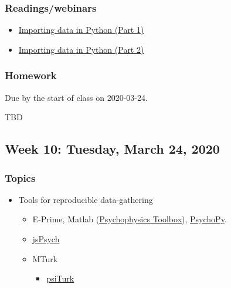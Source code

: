 \documentclass[
]{article}
\providecommand{\tightlist}{%
  \setlength{\itemsep}{0pt}\setlength{\parskip}{0pt}}
\begin{document}
\hypertarget{readingswebinars-6}{%
\subsubsection{Readings/webinars}\label{readingswebinars-6}}

\begin{itemize}
\tightlist
\item
  \href{https://www.datacamp.com/courses/importing-data-in-python-part-1}{Importing
  data in Python (Part 1)}
\item
  \href{https://www.datacamp.com/courses/importing-data-in-python-part-2}{Importing
  data in Python (Part 2)}
\end{itemize}

\hypertarget{homework-8}{%
\subsubsection{Homework}\label{homework-8}}

Due by the start of class on 2020-03-24.

TBD

\hypertarget{week-10-tuesday-march-24-2020}{%
\subsection{Week 10: Tuesday, March 24,
2020}\label{week-10-tuesday-march-24-2020}}

\hypertarget{topics-9}{%
\subsubsection{Topics}\label{topics-9}}

\begin{itemize}
\tightlist
\item
  Tools for reproducible data-gathering

  \begin{itemize}
  \tightlist
  \item
    E-Prime, Matlab (\href{http://psychtoolbox.org/}{Psychophysics
    Toolbox}), \href{http://www.psychopy.org/}{PsychoPy}.
  \item
    \href{http://www.jspsych.org/}{jsPsych}
  \item
    MTurk

    \begin{itemize}
    \tightlist
    \item
      \href{https://psiturk.org/}{psiTurk}
    \end{itemize}
  \end{itemize}
\end{itemize}
\end{document}
